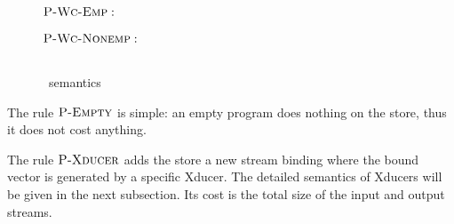 \begin{figure}[H]\large 
	
	\\
	
	
	 \\[2ex]
	
	 \\[4ex]
	
	$\textsc{P-Wc-Emp}:$\\
	
	\\[2ex]
	$\textsc{P-Wc-Nonemp}:$\\
		\\[4ex]
	
	
	\caption{\fmsvcode \  semantics}
	\label{fig-svcode-semantics}
\end{figure}

The rule $\textsc{P-Empty}$ is simple: an empty program does nothing on the store, thus it does not cost anything.

The rule $\textsc{P-Xducer}$ adds the store a new stream binding where the bound vector is generated by a specific Xducer. The detailed semantics of Xducers will be given in the next subsection.
Its cost is the total size of the input and output streams.

